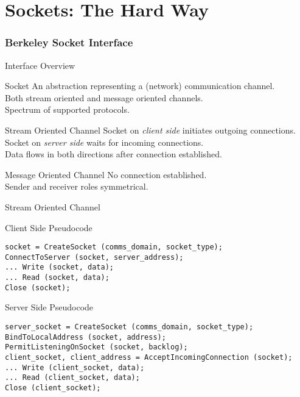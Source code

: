 \part{Sockets: The Hard Way}


\section{Berkeley Socket Interface}


\begin{frame}{Interface Overview}
    \begin{block}{Socket}
        An abstraction representing a (network) communication channel. \\
        Both stream oriented and message oriented channels. \\
        Spectrum of supported protocols. \\
    \end{block}

    \begin{block}{Stream Oriented Channel}
        Socket on \emph{client side} initiates outgoing connections. \\
        Socket on \emph{server side} waits for incoming connections. \\
        Data flows in both directions after connection established. \\
    \end{block}

    \begin{block}{Message Oriented Channel}
        No connection established. \\
        Sender and receiver roles symmetrical. \\
    \end{block}
\end{frame}


\begin{frame}[fragile]{Stream Oriented Channel}
    \begin{block}{Client Side Pseudocode}
\begin{lstlisting}[style=mini]
socket = CreateSocket (comms_domain, socket_type);
ConnectToServer (socket, server_address);
... Write (socket, data);
... Read (socket, data);
Close (socket);
\end{lstlisting}
    \end{block}
    \begin{block}{Server Side Pseudocode}
\begin{lstlisting}[style=mini]
server_socket = CreateSocket (comms_domain, socket_type);
BindToLocalAddress (socket, address);
PermitListeningOnSocket (socket, backlog);
client_socket, client_address = AcceptIncomingConnection (socket);
... Write (client_socket, data);
... Read (client_socket, data);
Close (client_socket);
\end{lstlisting}
    \end{block}
\end{frame}


